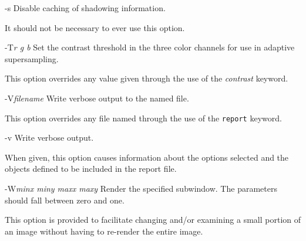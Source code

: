 \begin{defkey}{-s}{}
	Disable caching of  shadowing information.
\end{defkey}
It should not be necessary to ever use this option.

\begin{defkey}{-T}{{\em r g b}}
	Set the contrast threshold in the three
	color channels for use in adaptive supersampling.
\end{defkey}
This option overrides any value given through the use of
the {\em contrast} keyword.

\begin{defkey}{-V}{{\em	filename}}
	Write verbose output to the named file.
\end{defkey}
This option overrides any file named through the use of
the {\tt report} keyword.

\begin{defkey}{-v}{}
	Write verbose output.
\end{defkey}
When given, this option causes information about the options
selected and the objects defined to be included in the
report file.

\begin{defkey}{-W}{{\em minx miny maxx maxy}}
	Render the specified subwindow.  The parameters
	should fall between zero and one.
\end{defkey}
This option is provided to facilitate changing and/or examining a
small portion of an image without having to re-render the entire
image.
